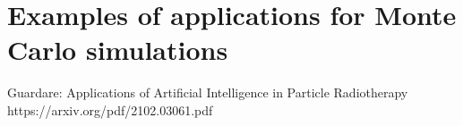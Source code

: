 \section{Examples of applications for Monte Carlo simulations}
\label{sec:examples}







Guardare:
Applications of Artificial Intelligence in Particle Radiotherapy
https://arxiv.org/pdf/2102.03061.pdf





